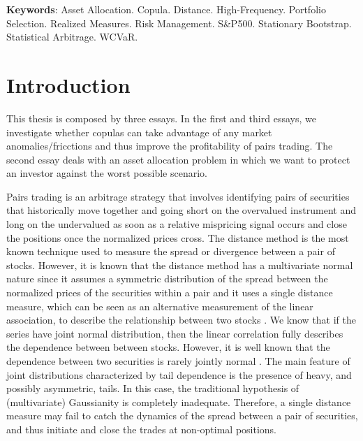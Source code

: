 \documentclass[a4paper,12pt]{report}
\begin{document}
\begin{refsection}
	\noindent
	\textbf{Keywords}: Asset Allocation. Copula. Distance. High-Frequency. Portfolio Selection. Realized Measures. Risk Management. S\&P500. Stationary Bootstrap. Statistical Arbitrage. WCVaR.
	
	
	
	\thispagestyle{empty}
	\renewcommand{\contentsname}{\centerline{Sumário}}
	\tableofcontents
	\thispagestyle{empty}
	
	
	\chapter{Introduction}
	\thispagestyle{myheadings}
	\markright{}
	
	\setcounter{page}{10}
	
	
	
	\setlength{\baselineskip}{12pt}
	
	This thesis is composed by three essays. In the first and third essays, we investigate whether copulas can take advantage of any market anomalies/fricctions and thus improve the profitability of pairs trading. The second essay deals with an asset allocation problem in which we want to protect an investor against the worst possible scenario.
	
	Pairs trading is an arbitrage strategy that involves identifying pairs of securities that historically move together and going short on the overvalued instrument and long on the undervalued as soon as a relative mispricing signal occurs and close the positions once the normalized prices cross. The distance method is the most known technique used to measure the spread or divergence between a pair of stocks. However, it is known that the distance method has a multivariate normal nature since it assumes a symmetric distribution of the spread between the normalized prices of the securities within a pair and it uses a single distance measure, which can be seen as an alternative measurement of the linear association, to describe the relationship between two stocks \citep{xie14}. We know that if the series have joint normal distribution, then the linear correlation fully describes the dependence between between stocks. However, it is well known that the dependence between two securities is rarely jointly normal \citep{campbell97,cont01,ane03,mcneil15}. The main feature of joint distributions characterized by tail dependence is the presence of heavy, and possibly asymmetric, tails. In this case, the traditional hypothesis of (multivariate) Gaussianity is completely inadequate. Therefore, a single distance measure may fail to catch the dynamics of the spread between a pair of securities, and thus initiate and close the trades at non-optimal positions.
	

\end{refsection}
\end{document}
